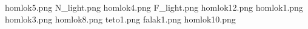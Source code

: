 homlok5.png
N_light.png
homlok4.png
F_light.png
homlok12.png
homlok1.png
homlok3.png
homlok8.png
teto1.png
falak1.png
homlok10.png
